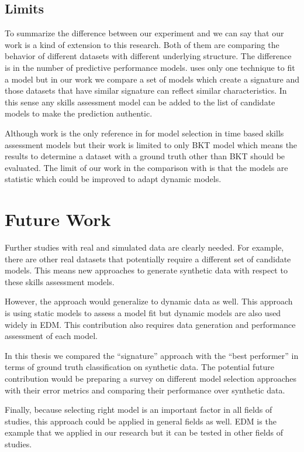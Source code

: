 \subsection{Limits}


To summarize the difference between our experiment and \cite{Desmarais2010} we can say that our work is a kind of extension to this research. Both of them are comparing the behavior of different datasets with different underlying structure. The difference is in the number of predictive performance models. \cite{Desmarais2010} uses only one technique to fit a model but in our work we compare a set of models which create a signature and those datasets that have similar signature can reflect similar characteristics. In this sense any skills assessment model can be added to the list of candidate models to make the prediction authentic.

Although \citet{Rosenberg2015} work is the only reference in for model selection in time based skills assessment models but their work is limited to only BKT model which means the results to determine a dataset with a ground truth other than BKT should be evaluated. The limit of our work in the comparison with \citet{Rosenberg2015} is that the models are statistic which could be improved to adapt dynamic models.

\section{Future Work}

Further studies with real and simulated data are clearly needed.  For example, there are other real datasets that potentially require a different set of candidate models. This means new approaches to generate synthetic data with respect to these skills assessment models.


However, the approach would generalize to dynamic data as well. This approach is using static models to assess a model fit but dynamic models are also used widely in EDM. This contribution also requires data generation and performance assessment of each model.

In this thesis we compared the ``signature'' approach with the ``best performer'' in terms of ground truth classification on synthetic data. The potential future contribution would be preparing a survey on different model selection approaches with their error metrics and comparing their performance over synthetic data.

Finally, because selecting right model is an important factor in all fields of studies, this approach could be applied in general fields as well. EDM is the example that we applied in our research but it can be tested in other fields of studies.
